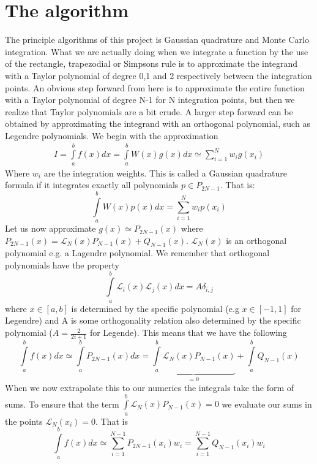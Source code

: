 \documentclass[a4paper,english, 10pt, twoside]{article}
\begin{document}
\section*{The algorithm}
The principle algorithms of this project is Gaussian quadrature and Monte Carlo integration. 
What we are actually doing when we integrate a function by the use of the rectangle, trapezodial or Simpsons rule is to 
approximate the integrand with a Taylor polynomial of degree 0,1 and 2 respectively between the integration points. An obvious 
step forward from here is to approximate the entire function with a Taylor polynomial of degree N-1 for N integration points, 
but then we realize that Taylor polynomials are a bit crude. A larger step forward can be obtained by approximating the 
integrand with an orthogonal polynomial, such as Legendre polynomials.  
We begin with the approximation
\begin{align*}
I = \int\limits^b_a f(x)dx = \int\limits_a^b W(x)g(x)dx \simeq \sum\limits_{i=1}^N w_i g(x_i)
\end{align*}
Where $w_i$ are the integration weights.
This is called a Gaussian quadrature formula if it integrates exactly all polynomials $p \in P_{2N-1}$. That is:
$$
\int\limits_a^bW(x)p(x)dx = \sum\limits_{i=1}^Nw_ip(x_i)
$$
Let us now approximate $g(x) \simeq P_{2N-1}(x)$ where $P_{2N-1}(x) = \mathcal{L}_N(x)P_{N-1}(x)+Q_{N-1}(x)$. 
$\mathcal{L}_{N}(x)$ is an orthogonal polynomial e.g. a Lagendre polynomial. We remember that orthogonal polynomials have the 
property
$$
\int\limits_a^b\mathcal{L}_i(x)\mathcal{L}_j(x)dx = A\delta_{i,j}
$$
where $x\in[a,b]$ is determined by the specific polynomial (e.g $x\in[-1,1]$ for Legendre) and A is some orthogonality relation 
also determined by the specific polynomial ($A = \frac{2}{2i+1}$ for Legende). This means that we have the following
$$
\int\limits_a^bf(x)dx \simeq \int\limits_a^bP_{2N-1}(x)dx =\underbrace{\int\limits_a^b\mathcal{L}_N(x)P_{N-1}(x)}_{=0} + 
\int\limits_a^bQ_{N-1}(x)
$$
When we now extrapolate this to our numerics the integrals take the form of sums. To ensure that the term 
$\int\limits_a^b\mathcal{L}_N(x)P_{N-1}(x) = 0$ we evaluate our sums in the points $\mathcal{L}_N(x_i) = 0$. That is
$$
\int\limits_a^bf(x)dx \simeq \sum\limits_{i=1}^{N-1}P_{2N-1}(x_i)w_i = \sum\limits_{i=1}^{N-1}Q_{N-1}(x_i)w_i
$$
\end{document}
